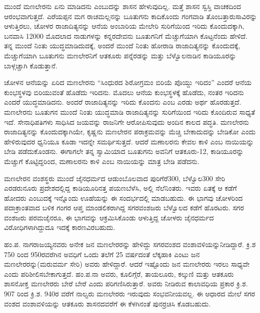 ಮುಂದೆ ಮಣಲೇರನು ಏನು ಮಾಡಿದನು ಎಂಬುದನ್ನು ಶಾಸನ ಹೇಳುವುದಿಲ್ಲ. ಮತ್ತೆ ಶಾಸನ ಸ್ವಸ್ತಿ ವಾಚಕದಿಂದ ಆರಂಭವಾಗುತ್ತದೆ. ಎರೆಯಪ್ಪನ ಮಗ ರಾಚಮಲ್ಲನನ್ನು ಬೂತುಗನು ಕಾದಿಕೊಂದು ಗಂಗವಾಡಿ ತೊಂಬತ್ತಾರುಸಾವಿರನ್ನು ಆಳುತ್ತಿರಲು, ಚೋಳರ ರಾಜಾದಿತ್ಯನನ್ನು ಆನೆಯ ಅಂಬಾರಿಯ ಮೇಲೇರಿ ಸುರಿಗೆಯಿಂದ ಇರಿದು ಕೊಂದುದಕ್ಕಾಗಿ, ಬನವಾಸಿ 12000 ಮೊದಲಾದ ನಾಡುಗಳನ್ನು ಕನ್ನರದೇವನು ಬೂತುಗನಿಗೆ ಮೆಚ್ಚುಗೆಯಾಗಿ ಕೊಟ್ಟನೆಂದು ಹೇಳಿದೆ. ತನ್ನ ಮುಂದೆ ನಿಂತು ಯುದ್ಧಮಾಡಿದುದಕ್ಕೆ, ಅಂದರೆ ಮುಂದೆ ನಿಂತು ಹೋರಾಡಿ ರಾಜಾದಿತ್ಯನನ್ನು ಕೊಂದುದಕ್ಕೆ, ಮೆಚ್ಚುಗೆಯಾಗಿ ಬೂತುಗನು ಮಣಲೇರನಿಗೆ ಆತಕೂರು ಪನ್ನೆರಡನ್ನು ಮತ್ತು ಬೆಳ್ವೊಲನಾಡಿನ ಕಾಡಿಯೂರನ್ನು ಬಾಳ್ಗಚ್ಚಾಗಿ ಕೊಡುತ್ತಾನೆ.

ಚೋಳನ ಆನೆಯನ್ನು ಏರಿದ ಮಣಲೇರನು “ಸಿಂಧುರದ ಶಿರೋಗ್ರಮಂ ಬಿರಿಯೆ ಪೊಯ್ದು ಇರಿದಂ” ಎಂದರೆ ಆನೆಯ ಕುಂಭಸ್ಥಳವು ಬಿರಿಯುವಂತೆ ಹೊಡೆದು ಇರಿದನು. ಮೊದಲು ಆನೆಯ ಕುಂಭಸ್ಥಳಕ್ಕೆ ಹೊಡೆದು, ನಂತರ ಇರಿದನು ಎಂದರೆ ಯುದ್ಧಮಾಡಿದನು. ಅಂದರೆ ರಾಜಾದಿತ್ಯನನ್ನು ಇರಿದು ಕೊಂದನು ಎಂಬ ಎರಡು ಅರ್ಥ ಹೊರಡುತ್ತದೆ. ಮಣಲೇರನು ಬೂತುಗನ ಮುಂದೆ ನಿಂತು ಯುದ್ಧಮಾಡಿ ರಾಜಾದಿತ್ಯನನ್ನು ಸುರಿಗೆಯಿಂದ ಇರಿದು ಕೊಂದಿರುವ ಸಾಧ್ಯತೆ ಇದೆ. ಸೇನಾಧಿಪತಿಗಳು ಸಾಧಿಸಿದ ಜಯವನ್ನು ರಾಜನಿಗೇ ಆರೋಪಿಸುವುದು ಅಂದಿನ ಕಾಲದ ಪದ್ಧತಿ. ಮಣಲೇರನು ರಾಜಾದಿತ್ಯನನ್ನು ಕೊಂದುದಕ್ಕಾಗಿಯೇ, ಕೃಷ್ಣನು ಮಣಲೇರನ ಪರಾಕ್ರಮವನ್ನು ಮೆಚ್ಚಿ ಬೇಕಾದುದನ್ನು ಬೇಡಿಕೋ ಎಂದು ಹೇಳಿರುವುದರ ಧ್ವನಿಯೂ ಕೂಡಾ ಇದನ್ನೇ ಸಮರ್ಥಿಸುತ್ತದೆ. ಆದರೆ ಮಣಾಲರನು ಕೇವಲ ಕಾಳಿ ಎಂಬ ನಾಯಿಯನ್ನು ಬೇಡಿ ಪಡೆದುಕೊಂಡನು. ಈಗಾಗಲೇ ತನ್ನ ಸ್ವಾಮಿಯಾದ ಬೂತುಗನು ಅವನಿಗೆ ಆತಕೂರು-12, ಕಾಡಿಯೂರನ್ನು ಮೆಚ್ಚುಗೆ ಕೊಟ್ಟಿದ್ದರಿಂದ, ಮಣಾಲರನು ಕಾಳಿ ಎಂಬ ನಾಯಿಯನ್ನು ಮಾತ್ರ ಬೇಡಿ ಪಡೆದನು.

ಮಣಲೇರನ ವಂಶಸ್ಥರು ಮುಂದೆ ಜೈನಧರ್ಮದ ಆಡುಂಬೊಲವಾದ ಪುರಿಗೆರೆ\enginline{-}300, ಬೆಳ್ವೊಲ\enginline{-}300 ಸೇರಿ ಎರಡರುನೂರು ಪ್ರದೇಶದಲ್ಲಿದ್ದ ಕಾಡಿಯೂರಿನತ್ತ ಪಯಣಬೆಳೆಸಿ, ಅಲ್ಲಿ ನೆಲೆನಿಂತರು. ಇವರು ಏತಕ್ಕೆ ಆ ಕಡೆಗೆ ಹೋದರು ಎಂಬುದಕ್ಕೆ ಇನ್ನೊಂದು ಊಹೆಯನ್ನು ಈ ಸಂದರ್ಭದಲ್ಲಿ ಮಾಡಬಹುದು. ಈ ಭಾಗವು ಚೋಳರಿಂದ ಪದಾಕ್ರಾಂತವಾದ ಬಳಿಕ ಗಂಗರ ಆಪ್ತ ಮಾಂಡಲಿಕರಾಗಿದ್ದ ಸಗರವಂಶಜರು ಬೆಳ್ವೊಲದ ಕಡೆಗೆ ಹೊರಟರು. ಸಗರ ವಂಶಜರು ಪರಮಜೈನರೂ, ಈ ಭಾಗವನ್ನು ಆಕ್ರಮಿಸಿಕೊಂಡು ಆಳುತ್ತಿದ್ದ ಚೋಳರು ಜೈನಧರ್ಮದ ವಿರೋಧಿಗಳಾಗಿದ್ದುದೂ ಇದಕ್ಕೆ ಕಾರಣವಿರಬಹುದು.

ಹಂ.ಪ. ನಾಗರಾಜಯ್ಯನವರು ಅನೇಕ ಜನ ಮಣಲೇರರನ್ನು ಹೇಳಿದ್ದು ಸಗರವಂಶದ ವಂಶಾವಳಿಯನ್ನು\break ನೀಡಿದ್ದಾರೆ. ಕ್ರಿ.ಶ 750 ರಿಂದ 950ರವರೆಗಿನ ಅವಧಿಗೆ ಒಂದು ತಲೆಗೆ 25 ವರ್ಷದಂತೆ ಲೆಕ್ಕಹಾಕಿ ಎಂಟು ಜನ ಮಣಲೇರರನ್ನು(ಮರುವರ್ಮ ಸೇರಿ) ಅವರು ಹೇಳಿದ್ದಾರೆ. ಆದರೆ ಇಷ್ಟೊಂದು ಜನ ಮಣಲೇರರು ಇರಲು ಸಾಧ್ಯವೇ ಎಂದು ಪರಿಶೀಲಿಸಬೇಕಾಗುತ್ತದೆ. ಹಂ.ಪ.ನಾ ಅವರು, ಕೂಲಿಗ್ಗೆರೆ, ತಾಯಲೂರು, ಕಲ್ಕುಣಿ ಮತ್ತು ಆತಕೂರು ಶಾಸನೋಕ್ತ ಮಣಲೇರರು ಬೇರೆ ಬೇರೆ ಎಂದು ಪರಿಗಣಿಸಿರುತ್ತಾರೆ. ಅವರು ನೀಡಿರುವ ಕಾಲಾವಧಿಯ ಪ್ರಕಾರ ಕ್ರಿ.ಶ. 907 ರಿಂದ ಕ್ರಿ.ಶ. 940ರ ವರೆಗೆ ನಾಲ್ವರು ಮಣಲೇರರು ಇರುವುದು ಸಂಭವನೀಯವಲ್ಲ. ಈ ಆಧಾರದ ಮೇಲೆ ಸಗರ ವಂಶದ ವಂಶಾವಳಿಯನ್ನು ಆತಕೂರು ಶಾಸನದವರೆಗೆ ಈ ಕೆಳಗಿನಂತೆ ಪುನರ್ರಚಿಸಿ ಕೊಡಬಹುದು.

